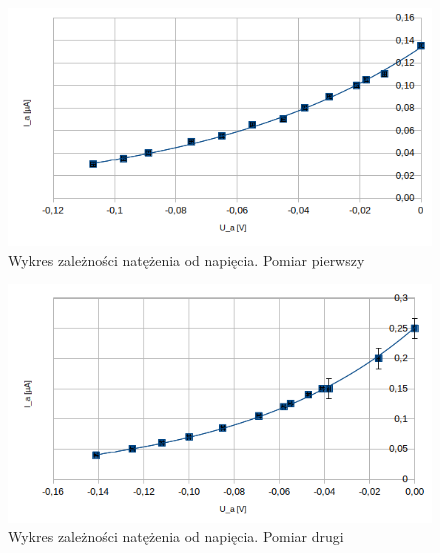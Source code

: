 \documentclass[a4paper]{article}
\begin{document}
\begin{figure}[h]
	\includegraphics[scale=0.75]{T1_Ia_U}
	\centering
	\caption{Wykres zależności natężenia od napięcia. Pomiar pierwszy}
	\label{exp1}
\end{figure}
\begin{figure}[h]
	\includegraphics[scale=0.75]{T2_Ia_U}
        \centering
        \caption{Wykres zależności natężenia od napięcia. Pomiar drugi}
	\label{exp2}
\end{figure}
\end{document}
